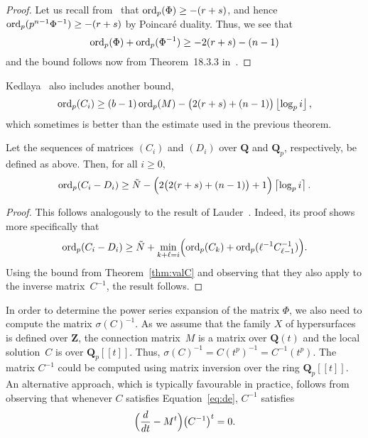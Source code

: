 \begin{proof}
Let us recall from~\citep[Lemma~3.3]{Gerkmann2007} that 
$\operatorname{ord}_p(\Phi) \geq -(r+s)$, and hence $\operatorname{ord}_p(p^{n-1}\Phi^{-1}) \geq -(r+s)$ 
by Poincar\'e duality.  Thus, we see that 
\begin{equation}
\operatorname{ord}_p(\Phi) + \operatorname{ord}_p(\Phi^{-1}) \geq - 2 (r+s) - (n-1)
\end{equation}
and the bound follows now from Theorem~{18.3.3} in~\citep{Kedlaya2010}.
\end{proof}

\begin{rem}
Kedlaya~\citep[Remark~18.3.4]{Kedlaya2010} also includes another bound,
\begin{equation}
\operatorname{ord}_p(C_i) \geq (b - 1) \operatorname{ord}_p(M) - \bigl(2 (r + s) + (n - 1)\bigr) \left\lfloor\log_p i\right\rfloor,
\end{equation}
which sometimes is better than the estimate used in the previous 
theorem.
\end{rem}

\begin{thm}
Let the sequences of matrices $(C_i)$ and $(D_i)$ over $\mathbf{Q}$ and 
$\mathbf{Q}_p$, respectively, be defined as above.  Then, for all $i \geq 0$, 
\begin{equation}
\operatorname{ord}_p(C_i - D_i) \geq 
    \tilde{N} - \Bigl(2 \bigl(2 (r+s) + (n-1)\bigr) + 1\Bigr) \left\lceil\log_p i\right\rceil.
\end{equation}
\end{thm}

\begin{proof}
This follows analogously to the result of 
Lauder~\citep[Theorem~5.1]{Lauder2006}.  
Indeed, its proof shows more specifically that 
\begin{equation}
\operatorname{ord}_p(C_i - D_i) \geq 
    \tilde{N} + \min_{k+\ell=i} \Bigl(\operatorname{ord}_p(C_k) + 
                                      \operatorname{ord}_p(\ell^{-1} C_{\ell-1}^{-1})\Bigr).
\end{equation}
Using the bound from Theorem~\ref{thm:valC} and observing that 
they also apply to the inverse matrix~$C^{-1}$, the result follows.
\end{proof}

In order to determine the power series expansion of the matrix $\Phi$, 
we also need to compute the matrix $\sigma(C)^{-1}$.  As we assume that 
the family $X$ of hypersurfaces is defined over $\mathbf{Z}$, the connection 
matrix~$M$ is a matrix over $\mathbf{Q}(t)$ and the local solution~$C$ is 
over $\mathbf{Q}_p[[t]]$.  Thus, $\sigma(C)^{-1} = C(t^p)^{-1} = C^{-1}(t^p)$. 
The matrix $C^{-1}$ could be computed using matrix inversion over the ring 
$\mathbf{Q}_p[[t]]$.  An alternative approach, which is typically favourable 
in practice, follows from observing that whenever $C$ satisfies 
Equation~\eqref{eq:de}, $C^{-1}$ satisfies 
\begin{equation}
\Bigl(\frac{d}{dt} - M^t\Bigr) \bigl(C^{-1}\bigr)^t = 0.
\end{equation}

